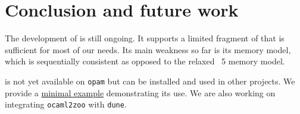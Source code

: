 \section{Conclusion and future work}

The development of \Zoo is still ongoing.
It supports a limited fragment of \OCaml that is sufficient for most of our needs.
Its main weakness so far is its memory model, which is sequentially consistent as opposed to the relaxed \OCaml~5 memory model.

\Zoo is not yet available on \texttt{opam} but can be installed and used in other \Coq projects.
We provide a \href{https://github.com/clef-men/zoo_demo}{minimal example} demonstrating its use.
We are also working on integrating \texttt{ocaml2zoo} with \texttt{dune}.